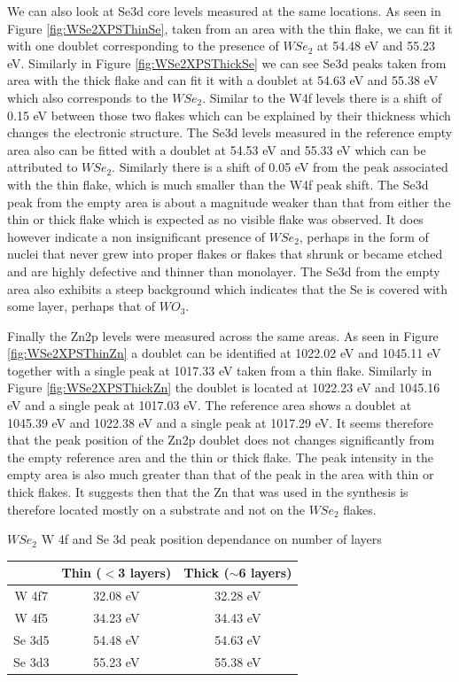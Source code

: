 We can also look at Se3d core levels measured at the same locations. As seen in Figure \ref{fig:WSe2XPSThinSe}, taken from an area with the thin flake, we can fit it with one doublet corresponding to the presence of $WSe_2$ at 54.48 eV and 55.23 eV. Similarly in Figure \ref{fig:WSe2XPSThickSe} we can see Se3d peaks taken from area with the thick flake and can fit it with a doublet at 54.63 eV and 55.38 eV which also corresponds to the $WSe_2$. Similar to the W4f levels there is a shift of 0.15 eV between those two flakes which can be explained by their thickness which changes the electronic structure. The Se3d levels measured in the reference empty area also can be fitted with a doublet at 54.53 eV and 55.33 eV which can be attributed to $WSe_2$. Similarly there is a shift of 0.05 eV from the peak associated with the thin flake, which is much smaller than the W4f peak shift. The Se3d peak from the empty area is about a magnitude weaker than that from either the thin or thick flake which is expected as no visible flake was observed. It does however indicate a non insignificant presence of $WSe_2$, perhaps in the form of nuclei that never grew into proper flakes or flakes that shrunk or became etched and are highly defective and thinner than monolayer. The Se3d from the empty area also exhibits a steep background which indicates that the Se is covered with some layer, perhaps that of $WO_3$. 

Finally the Zn2p levels were measured across the same areas. As seen in Figure \ref{fig:WSe2XPSThinZn} a doublet can be identified at 1022.02 eV and 1045.11 eV together with a single peak at 1017.33 eV taken from a thin flake. Similarly in Figure \ref{fig:WSe2XPSThickZn} the doublet is located at 1022.23 eV and 1045.16 eV and a single peak at 1017.03 eV. The reference area shows a doublet at 1045.39 eV and 1022.38 eV and a single peak at 1017.29 eV. It seems therefore that the peak position of the Zn2p doublet does not changes significantly from the empty reference area and the thin or thick flake. The peak intensity in the empty area is also much greater than that of the peak in the area with thin or thick flakes. It suggests then that the Zn that was used in the synthesis is therefore located mostly on a substrate and not on the $WSe_2$ flakes.

\begin{center}
\begin{table}[H]
\caption{$WSe_2$ W 4f and Se 3d peak position dependance on number of layers}
\label{tab:WSe2XPSTableComparison}
\end{table}
\end{center}
\begin{center}
\begin{tabular}{c|cc}
		& Thin ($<$3 layers) 	& Thick ($\sim$6 layers)\\ \hline
W 4f7	& 32.08 eV				& 32.28 eV				\\ 
W 4f5	& 34.23 eV				& 34.43 eV				\\
Se 3d5 	& 54.48 eV				& 54.63 eV				\\
Se 3d3  & 55.23 eV				& 55.38 eV				
\end{tabular}
\end{center}

